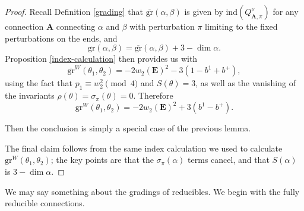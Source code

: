 \documentclass{memo-l}
\theoremstyle{definition}
\theoremstyle{remark}
\numberwithin{section}{chapter}
\numberwithin{equation}{chapter}
\begin{document}
\begin{proof}Recall Definition \ref{grading} that $\overline{\text{gr}}(\alpha, \beta)$ is given by $\text{ind}(Q^\nu_{\mathbf{A},\pi})$ for any connection $\mathbf{A}$ connecting $\alpha$ and $\beta$ with perturbation $\pi$ limiting to the fixed perturbations on the ends, and $$\text{gr}(\alpha, \beta) = \overline{\text{gr}}(\alpha, \beta) + 3 - \dim \alpha.$$
\noindent
Proposition \ref{index-calculation} then provides us with $$\overline{\text{gr}}^W(\theta_1, \theta_2) = -2w_2(\mathbf{E})^2  - 3(1-b^1+b^+),$$ using the fact that $p_1 \equiv w_2^2 \pmod 4$ and $S(\theta) = 3$, as well as the vanishing of the invariants $\rho(\theta) = \sigma_{\pi}(\theta) = 0$. Therefore $$\text{gr}^W(\theta_1, \theta_2) = -2w_2(\mathbf{E})^2 + 3(b^1 -b^+).$$

Then the conclusion is simply a special case of the previous lemma. 

The final claim follows from the same index calculation we used to calculate $\text{gr}^W(\theta_1, \theta_2)$; the key points are that the $\sigma_\pi(\alpha)$ terms cancel, and that 
$S(\alpha)$ is $3 - \dim \alpha.$
\end{proof}

We may say something about the gradings of reducibles. We begin with the fully reducible connections.
\end{document}
